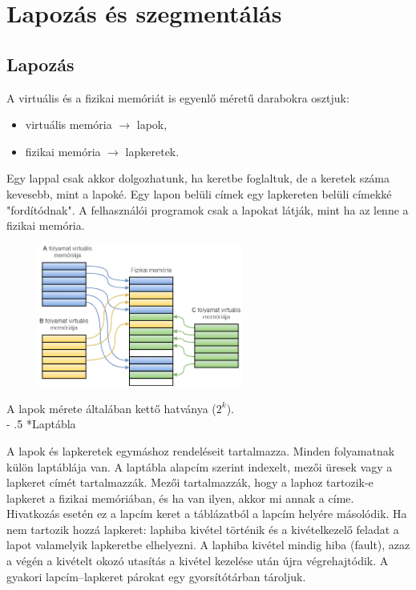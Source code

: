 \documentclass[tikz,12pt,margin=0px]{article}
\makeatletter
\renewcommand\paragraph{%
	\@startsection{paragraph}{4}{0mm}%
	{-\baselineskip}%
	{.5\baselineskip}%
	{\normalfont\normalsize\bfseries}}
\makeatother
\begin{document}
	\section*{Lapozás és szegmentálás}
	
	\subsection*{Lapozás}
	
    A virtuális és a fizikai memóriát is egyenlő méretű darabokra osztjuk:
    \begin{itemize}[topsep=8pt,itemsep=4pt,partopsep=4pt, parsep=4pt]
        \item virtuális memória $\rightarrow$ lapok,
        \item fizikai memória $\rightarrow$ lapkeretek.
    \end{itemize}

    \noindent Egy lappal csak akkor dolgozhatunk, ha keretbe foglaltuk, de a keretek száma kevesebb, mint a lapoké. Egy lapon belüli címek egy lapkereten belüli címekké "fordítódnak". A felhasználói programok csak a lapokat látják, mint ha az lenne a fizikai memória.\\

    \begin{figure}[H]
        \centering
        \includegraphics[width=0.6\textwidth]{img/paging.png}
        \caption{}
        \label{paging}
    \end{figure}

    \noindent A lapok mérete általában kettő hatványa ($2^k$).\\

    \paragraph*{Laptábla}

    \noindent A lapok és lapkeretek egymáshoz rendeléseit tartalmazza. Minden folyamatnak külön laptáblája van. A laptábla alapcím szerint indexelt, mezői üresek vagy a lapkeret címét tartalmazzák. Mezői tartalmazzák, hogy a laphoz tartozik-e lapkeret a fizikai memóriában, és ha van ilyen, akkor mi annak a címe. Hivatkozás esetén ez a lapcím keret a táblázatból a lapcím helyére másolódik. Ha nem tartozik hozzá lapkeret: laphiba kivétel történik és a kivételkezelő feladat a lapot valamelyik lapkeretbe elhelyezni. A laphiba kivétel mindig hiba (fault), azaz a végén a kivételt okozó utasítás a kivétel kezelése után újra végrehajtódik. A gyakori lapcím–lapkeret párokat egy gyorsítótárban tároljuk.
\end{document}
